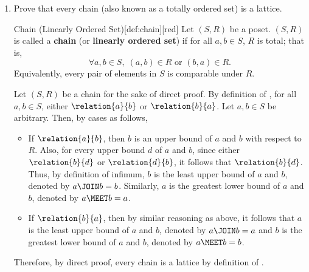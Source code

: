 \begin{enumerate}
  \item Prove that every chain (also known as a totally ordered set) is a lattice.
  \begin{define}{Chain (Linearly Ordered Set)}[def:chain][red]
    Let $(S, R)$ be a poset. $(S, R)$ is called a \textbf{chain} (or \textbf{linearly ordered set}) if for all $a, b \in S$, $R$ is total; that is,
    \[
      \forall a, b \in S,\; (a, b) \in R \text{ or } (b, a) \in R.
    \]
    Equivalently, every pair of elements in $S$ is comparable under $R$.
  \end{define}
  \begin{subprove}
    Let $(S, R)$ be a chain for the sake of direct proof.
    By definition of , for all $a, b \in S$, either $\relation{a}{b}$ or $\relation{b}{a}$.
    Let $a, b \in S$ be arbitrary. Then, by cases as follows,
    \begin{itemize}
      \item If $\relation{a}{b}$, then $b$ is an upper bound of $a$ and $b$ with respect to $R$.
      Also, for every upper bound $d$ of $a$ and $b$, 
      since either $\relation{b}{d}$ or $\relation{d}{b}$, 
      it follows that $\relation{b}{d}$.
      Thus, by definition of infimum, 
      $b$ is the least upper bound of $a$ and $b$, denoted by $a \JOIN b = b$.
      Similarly, $a$ is the greatest lower bound of $a$ and $b$, denoted by $a \MEET b = a$.
      \item If $\relation{b}{a}$, then by similar reasoning as above, 
      it follows that $a$ is the least upper bound of $a$ and $b$, denoted by $a \JOIN b = a$
      and $b$ is the greatest lower bound of $a$ and $b$, denoted by $a \MEET b = b$.
    \end{itemize}
    Therefore, by direct proof, every chain is a lattice by definition of .
  \end{subprove}



\end{enumerate}
